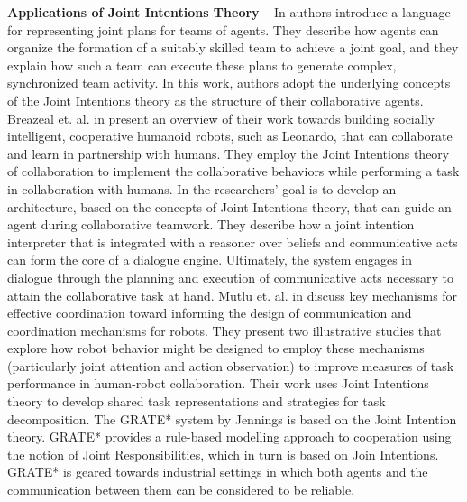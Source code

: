 \documentclass[12pt]{report}
\begin{document}
\textbf{Applications of Joint Intentions Theory} -- In \cite{kinny:planned-team}
authors introduce a language for representing joint plans for teams of agents.
They describe how agents can organize the formation of a suitably skilled team
to achieve a joint goal, and they explain how such a team can execute these
plans to generate complex, synchronized team activity. In this work, authors
adopt the underlying concepts of the Joint Intentions theory as the structure of
their collaborative agents. Breazeal et. al. in \cite{breazeal:humanoid-robots}
present an overview of their work towards building socially intelligent,
cooperative humanoid robots, such as Leonardo, that can collaborate and learn in
partnership with humans. They employ the Joint Intentions theory of
collaboration to implement the collaborative behaviors while performing a task
in collaboration with humans. In \cite{subramanian:joint-intention-dialogue}
the researchers' goal is to develop an architecture, based on the concepts of
Joint Intentions theory, that can guide an agent during collaborative teamwork.
They describe how a joint intention interpreter that is integrated with a
reasoner over beliefs and communicative acts can form the core of a dialogue
engine. Ultimately, the system engages in dialogue through the planning and
execution of communicative acts necessary to attain the collaborative task at
hand. Mutlu et. al. in \cite{mutlu:coordination-robot} discuss key mechanisms
for effective coordination toward informing the design of communication and
coordination mechanisms for robots. They present two illustrative studies that
explore how robot behavior might be designed to employ these mechanisms
(particularly joint attention and action observation) to improve measures of
task performance in human-robot collaboration. Their work uses Joint Intentions
theory to develop shared task representations and strategies for task
decomposition. The GRATE* system by Jennings
\cite{jennings:joint-intention-hybrid} is based on the Joint Intention theory.
GRATE* provides a rule-based modelling approach to cooperation using the notion
of Joint Responsibilities, which in turn is based on Join Intentions. GRATE* is
geared towards industrial settings in which both agents and the communication
between them can be considered to be reliable.\\
\end{document}
